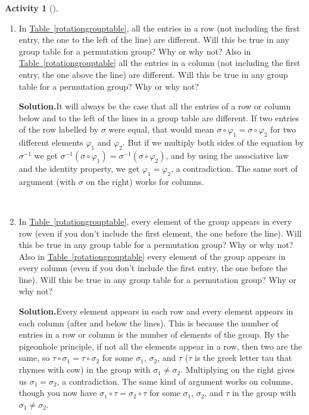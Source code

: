 \documentclass[10pt,]{book}
\theoremstyle{plain}
\theoremstyle{definition}
\newtheorem{activity}[project]{Activity}
\numberwithin{equation}{chapter}
\begin{document}
\begin{activity}[]\label{activity-264}
~\par
\begin{enumerate}[label=(\alph*)]
 \item In \hyperref[rotationgrouptable]{Table~\ref{rotationgrouptable}}, all the entries in a row (not including the first entry, the one to the left of the line) are different. Will this be true in any group table for a permutation group? Why or why not? Also in \hyperref[rotationgrouptable]{Table~\ref{rotationgrouptable}} all the entries in a column (not including the first entry, the one above the line) are different. Will this be true in any group table for a permutation group? Why or why not?%
\par\medskip\noindent%
\textbf{Solution.}\quad It will always be the case that all the entries of a row or column below and to the left of the lines in a group table are different. If two entries of the row labelled by \(\sigma\) were equal, that would mean \(\sigma\circ\varphi_1 =
\sigma\circ\varphi_2\) for two different elements \(\varphi_1\) and \(\varphi_2\). But if we multiply both sides of the equation by \(\sigma^{-1}\) we get \(\sigma^{-1}(\sigma\circ\varphi_1) =
\sigma^{-1}(\sigma\circ\varphi_2)\), and by using the associative law and the identity property, we get \(\varphi_1=\varphi_2\), a contradiction. The same sort of argument (with \(\sigma\) on the right) works for columns.%

~\par
\item In \hyperref[rotationgrouptable]{Table~\ref{rotationgrouptable}}, every element of the group appears in every row (even if you don't include the first element, the one before the line). Will this be true in any group table for a permutation group? Why or why not? Also in \hyperref[rotationgrouptable]{Table~\ref{rotationgrouptable}} every element of the group appears in every column (even if you don't include the first entry, the one before the line). Will this be true in any group table for a permutation group? Why or why not?%
\par\medskip\noindent%
\textbf{Solution.}\quad Every element appears in each row and every element appears in each column (after and below the lines). This is because the number of entries in a row or column is the number of elements of the group. By the pigeonhole principle, if not all the elements appear in a row, then two are the same, so \(\tau\circ \sigma_1 =\tau\circ\sigma_2\) for some \(\sigma_1\), \(\sigma_2\), and \(\tau\) (\(\tau\) is the greek letter tau that rhymes with cow) in the group with \(\sigma_1\not=
\sigma_2\). Multiplying on the right gives us \(\sigma_1 = \sigma_2\), a contradiction. The same kind of argument works on columns, though you now have \(\sigma_1\circ \tau =\sigma_2\circ \tau\) for some \(\sigma_1\), \(\sigma_2\), and \(\tau\) in the group with \(\sigma_1\not= \sigma_2\).%

\end{enumerate}
\end{activity}
\end{document}
